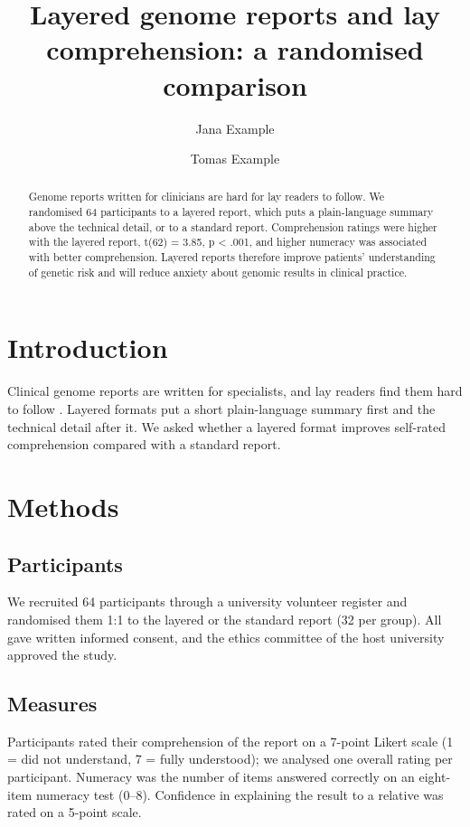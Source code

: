 \documentclass{article}
\title{Layered genome reports and lay comprehension: a randomised comparison}
\author{Jana Example \and Tomas Example}
\begin{document}
\maketitle

\begin{abstract}
Genome reports written for clinicians are hard for lay readers to follow. We randomised 64 participants
to a layered report, which puts a plain-language summary above the technical detail, or to a standard
report. Comprehension ratings were higher with the layered report, t(62) = 3.85, p < .001, and higher
numeracy was associated with better comprehension. Layered reports therefore improve patients'
understanding of genetic risk and will reduce anxiety about genomic results in clinical practice.
\end{abstract}

\section{Introduction}
Clinical genome reports are written for specialists, and lay readers find them hard to follow
\cite{haga2014,goehringer2018}. Layered formats put a short plain-language summary first and the
technical detail after it. We asked whether a layered format improves self-rated comprehension compared
with a standard report.

\section{Methods}
\subsection{Participants}
We recruited 64 participants through a university volunteer register and randomised them 1:1 to the
layered or the standard report (32 per group). All gave written informed consent, and the ethics
committee of the host university approved the study.

\subsection{Measures}
Participants rated their comprehension of the report on a 7-point Likert scale (1 = did not understand,
7 = fully understood); we analysed one overall rating per participant. Numeracy was the number of items
answered correctly on an eight-item numeracy test (0--8). Confidence in explaining the result to a
relative was rated on a 5-point scale.
\end{document}
